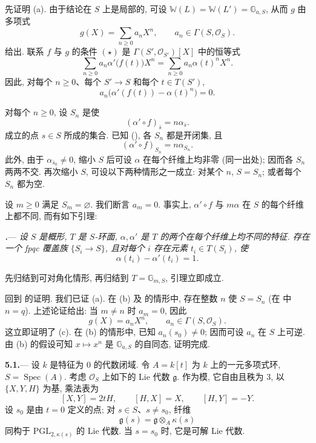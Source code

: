 先证明 \textup{(a)}. 由于结论在 \(S\) 上是局部的, 可设 \(\mathbb W(L)=\mathbb W(L')=\mathbb G_{a,S}\), 从而 \(g\) 由多项式
\[
  g(X)=\sum_{n\geq0}a_nX^n,
  \qquad
  a_n\in\Gamma(S,\mathcal O_S).
\]
给出. 联系 \(f\) 与 \(g\) 的条件 \textup{\((\star)\)} 是 \(\Gamma(S',\mathcal O_{S'})[X]\) 中的恒等式
\[
  \sum_{n\geq0}a_n\alpha'\bigl(f(t)\bigr)X^n
  =
  \sum_{n\geq0}a_n\alpha(t)^nX^n.
\]
因此, 对每个 \(n\geq0\)、每个 \(S'\to S\) 和每个 \(t\in T(S')\),
\[
  a_n\bigl(\alpha'(f(t))-\alpha(t)^n\bigr)=0.
\]

对每个 \(n\geq0\), 设 \(S_n\) 是使
\[
  (\alpha'\circ f)_{\bar s}=n\alpha_{\bar s}.
\]
成立的点 \(s\in S\) 所成的集合. 已知 \textup{()}, 各 \(S_n\) 都是开闭集, 且
\[
  (\alpha'\circ f)_{S_n}=n\alpha_{S_n}.
\]
此外, 由于 \(\alpha_{\bar s_0}\ne0\), 缩小 \(S\) 后可设 \(\alpha\) 在每个纤维上均非零 \textup{(同一出处)}; 因而各 \(S_n\) 两两不交. 再次缩小 \(S\), 可设以下两种情形之一成立: 对某个 \(n\), \(S=S_n\); 或者每个 \(S_n\) 都为空.

设 \(m\geq0\) 满足 \(S_m=\varnothing\). 我们断言 \(a_m=0\). 事实上, \(\alpha'\circ f\) 与 \(m\alpha\) 在 \(S\) 的每个纤维上都不同, 而有如下引理:

\par\medskip\noindent
\textbf{\textit{.}}---
\textit{设 \(S\) 是概形, \(T\) 是 \(S\)-环面, \(\alpha,\alpha'\) 是 \(T\) 的两个在每个纤维上均不同的特征. 存在一个 fpqc 覆盖族 \(\{S_i\to S\}\), 且对每个 \(i\) 存在元素 \(t_i\in T(S_i)\), 使}
\[
  \alpha(t_i)-\alpha'(t_i)=1.
\]

先归结到可对角化情形, 再归结到 \(T=\mathbb G_{m,S}\), 引理立即成立.

回到 的证明. 我们已证 \textup{(a)}. 在 \textup{(b)} 及 \textup{} 的情形中, 存在整数 \(n\) 使 \(S=S_n\) \textup{(在 \textup{} 中 \(n=q\))}. 上述论证给出: 当 \(m\ne n\) 时 \(a_m=0\), 因此
\[
  g(X)=a_nX^n,
  \qquad
  a_n\in\Gamma(S,\mathcal O_S).
\]
这立即证明了 \textup{(c)}. 在 \textup{(b)} 的情形中, 已知 \(a_n(s_0)\ne0\); 因而可设 \(a_n\) 在 \(S\) 上可逆. 由 \textup{(b)} 的假设可知 \(x\longmapsto x^n\) 是 \(\mathbb G_{a,S}\) 的自同态, 证明完成.

\par\medskip\noindent
\textbf{5.1.}---
设 \(k\) 是特征为 \(0\) 的代数闭域. 令 \(A=k[t]\) 为 \(k\) 上的一元多项式环, \(S=\operatorname{Spec}(A)\). 考虑 \(\mathcal O_S\) 上如下的 Lie 代数 \(\mathfrak g\). 作为模, 它自由且秩为 \(3\), 以 \(\{X,Y,H\}\) 为基, 乘法表为
\[
  [X,Y]=2tH,
  \qquad
  [H,X]=X,
  \qquad
  [H,Y]=-Y.
\]
设 \(s_0\) 是由 \(t=0\) 定义的点; 对 \(s\in S\)、\(s\ne s_0\), 纤维
\[
  \mathfrak g(s)=\mathfrak g\otimes_A\kappa(s)
\]
同构于 \(\mathrm{PGL}_{2,\kappa(s)}\) 的 Lie 代数. 当 \(s=s_0\) 时, 它是可解 Lie 代数.

